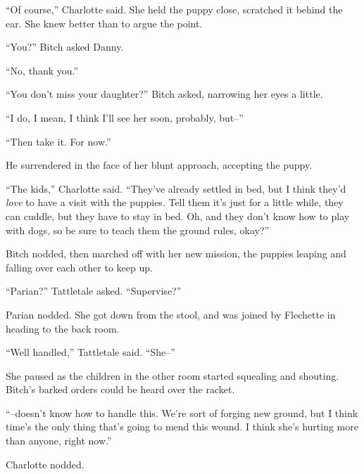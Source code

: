 ``Of course,'' Charlotte said.  She held the puppy close, scratched it behind the ear.  She knew better than to argue the point.



``You?'' Bitch asked Danny.



``No, thank you.''



``You don't miss your daughter?'' Bitch asked, narrowing her eyes a little.



``I do, I mean, I think I'll see her soon, probably, but--''



``Then take it.  For now.''



He surrendered in the face of her blunt approach, accepting the puppy.



``The kids,'' Charlotte said.  ``They've already settled in bed, but I think they'd \emph{love} to have a visit with the puppies.  Tell them it's just for a little while, they can cuddle, but they have to stay in bed.  Oh, and they don't know how to play with dogs, so be sure to teach them the ground rules, okay?''



Bitch nodded, then marched off with her new mission, the puppies leaping and falling over each other to keep up.



``Parian?'' Tattletale asked.  ``Supervise?''



Parian nodded.  She got down from the stool, and was joined by Flechette in heading to the back room.



``Well handled,'' Tattletale said.  ``She--''



She paused as the children in the other room started squealing and shouting.  Bitch's barked orders could be heard over the racket.



``--doesn't know how to handle this.  We're sort of forging new ground, but I think time's the only thing that's going to mend this wound.  I think she's hurting more than anyone, right now.''



Charlotte nodded.



